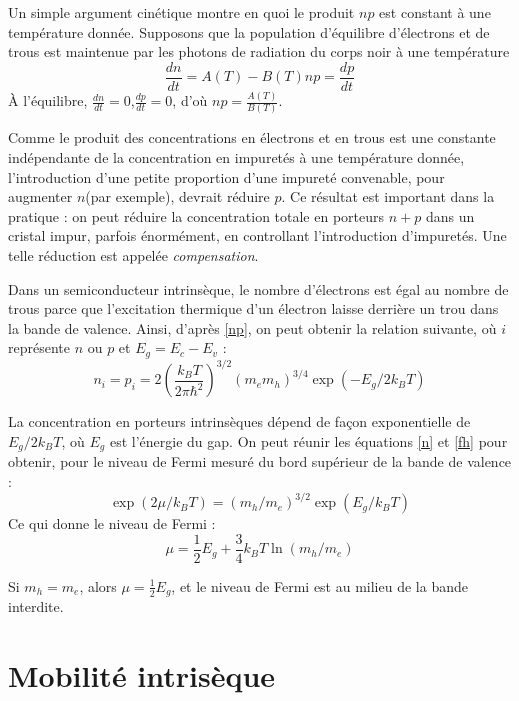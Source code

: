 Un simple argument cinétique montre en quoi le produit $np$ est constant à une
température donnée. Supposons que la population d'équilibre d'électrons et de
trous est maintenue par les photons de radiation du corps noir à une température
\begin{equation}
    \frac{dn}{dt} = A(T) - B(T)np = \frac{dp}{dt}
\end{equation}
À l'équilibre, $\frac{dn}{dt} = 0$,$\frac{dp}{dt} = 0$, d'où $np =
\frac{A(T)}{B(T)}$.

Comme le produit des concentrations en électrons et en trous est une constante
indépendante de la concentration en impuretés à une température donnée,
l'introduction d'une petite proportion d'une impureté convenable, pour augmenter
$n$(par exemple), devrait réduire $p$.
Ce résultat est important dans la pratique : on peut réduire la concentration
totale en porteurs $n+p$ dans un cristal impur, parfois énormément, en
controllant l'introduction d'impuretés. Une telle réduction est appelée
\emph{compensation}.

Dans un semiconducteur intrinsèque, le nombre d'électrons est égal au nombre de
trous parce que l'excitation thermique d'un électron laisse derrière un trou dans
la bande de valence. Ainsi, d'après \ref{np}, on peut obtenir la relation
suivante, où $i$ représente $n$ ou $p$ et $E_g = E_c - E_v$ :
\begin{equation}
    n_i = p_i = 2 \left( \frac{k_BT}{2\pi\hbar^2} \right)^{3/2} (m_em_h)^{3/4}
    \exp(-E_g / 2k_BT)
\end{equation}

La concentration en porteurs intrinsèques dépend de façon exponentielle de
$E_g/2k_BT$, où $E_g$ est l'énergie du gap. On peut réunir les équations \ref{n}
et \ref{fh} pour obtenir, pour le niveau de Fermi mesuré du bord supérieur de la
bande de valence :
\begin{equation}
    \exp(2\mu/k_BT) = (m_h/m_e)^{3/2}\exp(E_g/k_BT)
\end{equation}
Ce qui donne le niveau de Fermi :
\begin{equation}
    \mu = \frac{1}{2}E_g + \frac{3}{4} k_BT \ln(m_h/m_e)
\end{equation}

Si $m_h = m_e$, alors $\mu = \frac{1}{2}E_g$, et le niveau de Fermi est au milieu
de la bande interdite.

\section{Mobilité intrisèque}

